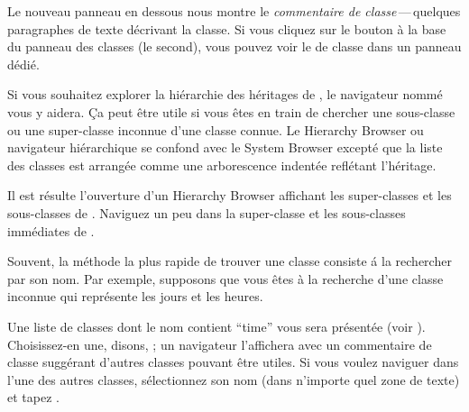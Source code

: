 \documentclass[a4paper,10pt,twoside]{book}
\begin{document}
Le nouveau panneau en dessous nous montre le \emph{commentaire de
  classe}\,---\,quelques paragraphes de texte d\'ecrivant la classe.
Si vous cliquez sur le bouton  \`a la base du panneau des
classes 
(\cad le second),
vous pouvez voir le  de classe dans un
panneau d\'edi\'e.


Si vous souhaitez explorer la hi\'erarchie des h\'eritages de \sq, le
navigateur nomm\'e  vous y aidera.
Ça peut \^etre utile si vous \^etes en train de chercher une
sous-classe ou une super-classe inconnue d'une classe connue.
Le Hierarchy Browser ou navigateur hi\'erarchique se confond avec le
System Browser except\'e que la liste des classes est arrang\'ee comme
une arborescence indent\'ee refl\'etant l'h\'eritage.

\noindent
Il est r\'esulte l'ouverture d'un Hierarchy Browser affichant les
super-classes et les sous-classes de .
Naviguez un peu dans la super-classe et les sous-classes imm\'ediates
de .

Souvent, la m\'ethode la plus rapide de trouver une classe consiste
\'a la rechercher par son nom. Par exemple, supposons que vous \^etes
\`a la recherche d'une classe inconnue qui repr\'esente les jours et
les heures.%

\noindent
Une liste de classes dont le nom contient ``time'' vous sera
pr\'esent\'ee (voir ). Choisissez-en une, disons,
; 
un navigateur l'affichera avec un commentaire de classe
sugg\'erant d'autres classes pouvant \^etre utiles. Si vous voulez
naviguer dans l'une des autres classes, s\'electionnez son nom (dans
n'importe quel zone de texte) et tapez .
\end{document}
